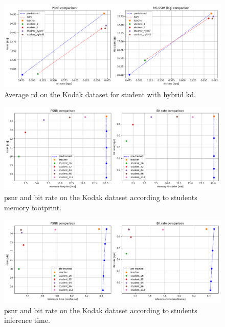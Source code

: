 \documentclass{article}
\begin{document}
\begin{figure}
    \centering
    \includegraphics[width=15cm]{kd_lic_hyper_hybrid_rd_lambda_1.png}
    \caption[Average \acrshort{rd} on the Kodak dataset for student with hybrid \acrshort{kd}.]{Average \acrshort{rd} on the Kodak dataset for student with hybrid \acrshort{kd}.}
    \label{kd_lic_8}
\end{figure}

\begin{figure}
  \centering
  \includegraphics[width=15cm]{kd_lic_memory.png}
  \caption[\acrshort{psnr} and bit rate on the Kodak dataset according to students memory footprint.]{\acrshort{psnr} and bit rate on the Kodak dataset according to students memory footprint.}
  \label{appendix:kd_lic_memory}
\end{figure}

\begin{figure}
  \centering
  \includegraphics[width=15cm]{kd_lic_time.png}
  \caption[\acrshort{psnr} and bit rate on the Kodak dataset according to students inference time.]{\acrshort{psnr} and bit rate on the Kodak dataset according to students inference time.}
  \label{appendix:kd_lic_time}
\end{figure}
\end{document}
